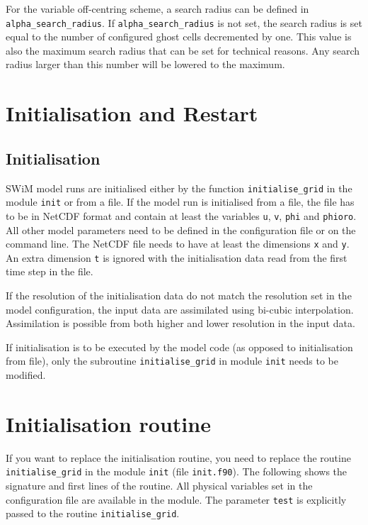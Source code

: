 \documentclass[11pt,a4paper,openright,twoside]{book}
\newcommand{\thecodenospace}{SWiM}
\newcommand{\thecode}{\thecodenospace{ }}
\begin{document}
For the variable off-centring scheme, a search radius can be defined in \texttt{alpha\_search\_radius}.
If \texttt{alpha\_search\_radius} is not set, the search radius is set equal to the number of configured ghost cells decremented by one. This value is also the maximum search radius that can be set for technical reasons. Any search radius larger than
this number will be lowered to the maximum.

\section{Initialisation and Restart}
\subsection{Initialisation}
\thecode model runs are initialised either by the function \texttt{initialise\_grid} in the module \texttt{init} or from a
file. If the model run is initialised from a file, the file has to be in NetCDF format and contain at least the variables
\texttt{u}, \texttt{v}, \texttt{phi} and \texttt{phioro}. All other model parameters need to be defined in the configuration
file or on the command line. The NetCDF file needs to have at least the dimensions \texttt{x} and \texttt{y}. An extra
dimension \texttt{t} is ignored with the initialisation data read from the first time step in the file.

If the resolution of the initialisation data do not match the resolution set in the model configuration, the input data are
assimilated using bi-cubic interpolation. Assimilation is possible from both higher and lower resolution in the input data.

If initialisation is to be executed by the model code (as opposed to initialisation from file), only the subroutine
\texttt{initialise\_grid} in module \texttt{init} needs to be modified.

\section{Initialisation routine}
\label{init-routine}
If you want to replace the initialisation routine, you need to replace the routine \texttt{initialise\_grid} in the module
\texttt{init} (file \texttt{init.f90}). The following shows the signature and first lines of the routine. All physical
variables set in the configuration file are available in the module. The parameter \texttt{test} is explicitly passed to the
routine \texttt{initialise\_grid}.
\end{document}
